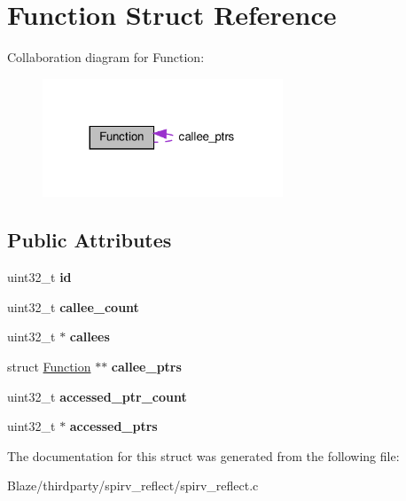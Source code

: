 \hypertarget{structFunction}{}\section{Function Struct Reference}
\label{structFunction}


Collaboration diagram for Function\+:\nopagebreak
\begin{figure}[H]
\begin{center}
\leavevmode
\includegraphics[width=203pt]{structFunction__coll__graph}
\end{center}
\end{figure}
\subsection*{Public Attributes}
\begin{DoxyCompactItemize}
\item 
\mbox{\label{structFunction_a377c3fb5a03f678533cb399a3156fdc7}} 
uint32\+\_\+t {\bfseries id}
\item 
\mbox{\label{structFunction_af1096d3bc69d3dd8cd430fda299903b2}} 
uint32\+\_\+t {\bfseries callee\+\_\+count}
\item 
\mbox{\label{structFunction_ad51c85d27e9f2e5e525b52a92c2531ec}} 
uint32\+\_\+t $\ast$ {\bfseries callees}
\item 
\mbox{\label{structFunction_aba86f50d08afba07b40bff185dab5ec6}} 
struct \hyperlink{structFunction}{Function} $\ast$$\ast$ {\bfseries callee\+\_\+ptrs}
\item 
\mbox{\label{structFunction_a86458cadf16f593bd4c34d9df2269307}} 
uint32\+\_\+t {\bfseries accessed\+\_\+ptr\+\_\+count}
\item 
\mbox{\label{structFunction_a69f2e3d43ef9607318619fe2e7e04fa2}} 
uint32\+\_\+t $\ast$ {\bfseries accessed\+\_\+ptrs}
\end{DoxyCompactItemize}


The documentation for this struct was generated from the following file\+:\begin{DoxyCompactItemize}
\item 
Blaze/thirdparty/spirv\+\_\+reflect/spirv\+\_\+reflect.\+c\end{DoxyCompactItemize}
